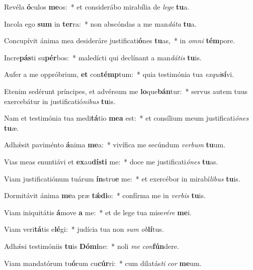 \item Revéla \textbf{ó}culos \textbf{me}os:~* et considerábo mirabília de \textit{le}\textit{ge} \textbf{tu}a.
\item Incola ego \textbf{sum} in \textbf{ter}ra:~* non abscóndas a me man\textit{dá}\textit{ta} \textbf{tu}a.
\item Concupívit ánima mea desideráre justificati\textbf{ó}nes \textbf{tu}as,~* in \textit{om}\textit{ni} \textbf{tém}pore.
\item Incre\textbf{pás}ti su\textbf{pér}bos:~* maledícti qui declínant a man\textit{dá}\textit{tis} \textbf{tu}is.
\item Aufer a me oppróbrium, \textbf{et} con\textbf{témp}tum:~* quia testimónia tua \textit{ex}\textit{qui}\textbf{sí}vi.
\item Etenim sedérunt príncipes, et advérsum me \textbf{lo}que\textbf{bán}tur:~* servus autem tuus exercebátur in justificatió\textit{ni}\textit{bus} \textbf{tu}is.
\item Nam et testimónia tua medi\textbf{tá}tio \textbf{me}\textbf{a} est:~* et consílium meum justificati\textit{ó}\textit{nes} \textbf{tu}æ.
\item Adhǽsit paviménto \textbf{á}nima \textbf{me}a:~* vivífica me secúndum \textit{ver}\textit{bum} \textbf{tu}um.
\item Vias meas enuntiávi et \textbf{ex}au\textbf{dís}\textbf{ti} me:~* doce me justificati\textit{ó}\textit{nes} \textbf{tu}as.
\item Viam justificatiónum tuárum \textbf{ín}stru\textbf{e} me:~* et exercébor in mirabí\textit{li}\textit{bus} \textbf{tu}is.
\item Dormitávit ánima \textbf{me}a præ \textbf{tǽ}\textbf{di}o:~* confírma me in \textit{ver}\textit{bis} \textbf{tu}is.
\item Viam iniquitátis \textbf{á}move \textbf{a} me:~* et de lege tua mise\textit{ré}\textit{re} \textbf{me}i.
\item Viam veri\textbf{tá}tis e\textbf{lé}gi:~* judícia tua non \textit{sum} \textit{ob}\textbf{lí}tus.
\item Adhǽsi testimóniis \textbf{tu}is \textbf{Dó}\textbf{mi}ne:~* noli \textit{me} \textit{con}\textbf{fún}dere.
\item Viam mandatórum tu\textbf{ó}rum cu\textbf{cúr}ri:~* cum dilatás\textit{ti} \textit{cor} \textbf{me}um.
